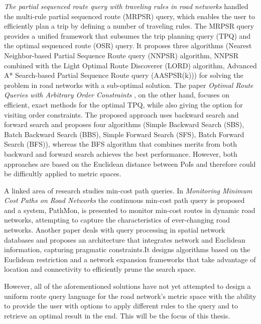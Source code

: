 \textit{The partial sequenced route query with traveling rules in road networks} \cite{multi} handled the multi-rule partial sequenced route (MRPSR) query, which enables the user to efficiently plan a trip by defining a number of traveling rules. The MRPSR query provides a unified framework that subsumes the trip planning query (TPQ) and the optimal sequenced route (OSR) query. It proposes three algorithms (Nearest Neighbor-based Partial Sequence Route query (NNPSR) algorithm, NNPSR combined with the Light Optimal Route Discoverer (LORD) algorithm, Advanced A* Search-based Partial Sequence Route query (AASPSR(k))) for solving the problem in road networks with a sub-optimal solution. The paper \textit{Optimal Route Queries with Arbitrary Order Constraints} \cite{optMulti}, on the other hand, focuses on efficient, exact methods for the optimal TPQ, while also giving the option for visiting order constraints. The proposed approach uses backward search and forward search and proposes four algorithms (Simple Backward Search (SBS), Batch Backward Search (BBS), Simple Forward Search (SFS), Batch Forward Search (BFS)), whereas the BFS algorithm that combines merits from both backward and forward search achieves the best performance. However, both approaches are based on the Euclidean distance between PoIs and therefore could be difficultly applied to metric spaces.

A linked area of research studies min-cost path queries. In \textit{Monitoring Minimum Cost Paths on Road Networks} \cite{minCost} the continuous min-cost path query is proposed and a system, PathMon, is presented to monitor min-cost routes in dynamic road networks, attempting to capture the characteristics of ever-changing road networks. Another paper \cite{spatialDB} deals with query processing in spatial network databases and proposes an architecture that integrates network and Euclidean information, capturing pragmatic constraints.It designs algorithms based on the Euclidean restriction and a network expansion frameworks that take advantage of location and connectivity to efficiently prune the search space.

However, all of the aforementioned solutions have not yet attempted to design a uniform route query language for the road network's metric space with the ability to provide the user with options to apply different rules to the query and to retrieve an optimal result in the end. This will be the focus of this thesis.